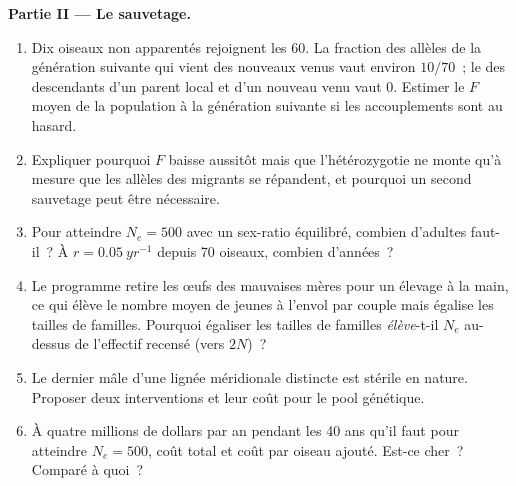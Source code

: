 \begin{problem}
\medskip
\noindent\textbf{Partie II --- Le sauvetage.}
\begin{enumerate}[resume]
  \item Dix oiseaux non apparentés rejoignent les 60. La fraction des
        allèles de la génération suivante qui vient des nouveaux venus
        vaut environ $10/70$~; le  des
        descendants d'un parent local et d'un nouveau venu vaut $0$.
        Estimer le $F$ moyen de la population à la génération suivante si
        les accouplements sont au hasard.
  \item Expliquer pourquoi $F$ baisse aussitôt mais que l'hétérozygotie
        ne monte qu'à mesure que les allèles des migrants se répandent,
        et pourquoi un second sauvetage peut être nécessaire.
  \item Pour atteindre $N_{e} = 500$ avec un sex-ratio équilibré, combien
        d'adultes faut-il~? À $r = \qty{0.05}{yr^{-1}}$ depuis 70
        oiseaux, combien d'années~?
  \item Le programme retire les œufs des mauvaises mères pour un élevage
        à la main, ce qui élève le nombre moyen de jeunes à l'envol par
        couple mais égalise les tailles de familles. Pourquoi égaliser
        les tailles de familles \emph{élève}-t-il $N_{e}$ au-dessus de
        l'effectif recensé (vers $2N$)~?
  \item Le dernier mâle d'une lignée méridionale distincte est stérile
        en nature. Proposer deux interventions et leur coût pour le pool
        génétique.
  \item À quatre millions de dollars par an pendant les 40 ans qu'il
        faut pour atteindre $N_{e} = 500$, coût total et coût par oiseau
        ajouté. Est-ce cher~? Comparé à quoi~?
\end{enumerate}


\end{problem}
